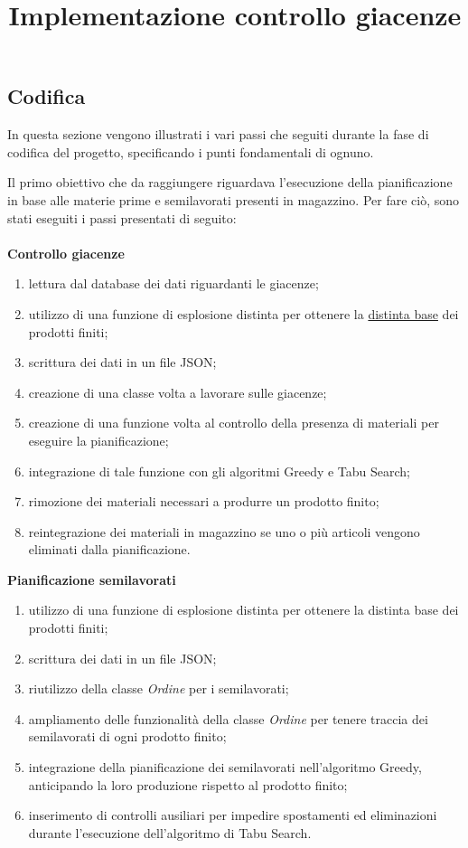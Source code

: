 \subsection{Codifica}

In questa sezione vengono illustrati i vari passi che seguiti durante la fase di codifica del progetto, specificando i punti fondamentali di ognuno.\\

\title{Implementazione controllo giacenze}

Il primo obiettivo che da raggiungere riguardava l'esecuzione della pianificazione in base alle materie prime e semilavorati presenti in magazzino.
Per fare ciò, sono stati eseguiti i passi presentati di seguito:\\ \\
\textbf{Controllo giacenze}
\begin{enumerate}
        \item lettura dal database dei dati riguardanti le giacenze;
        \item utilizzo di una funzione di esplosione distinta per ottenere la \hyperref[Distinta base]{distinta base\glo} dei prodotti finiti; 
        \item scrittura dei dati in un file JSON;
        \item creazione di una classe volta a lavorare sulle giacenze;
        \item creazione di una funzione volta al controllo della presenza di materiali per eseguire la pianificazione;
        \item integrazione di tale funzione con gli algoritmi Greedy e Tabu Search;
        \item rimozione dei materiali necessari a produrre un prodotto finito;
        \item reintegrazione dei materiali in magazzino se uno o più articoli vengono eliminati dalla pianificazione.\\
\end{enumerate}

\textbf{Pianificazione semilavorati} 
\begin{enumerate}
        \item utilizzo di una funzione di esplosione distinta per ottenere la distinta base dei prodotti finiti; 
        \item scrittura dei dati in un file JSON;
        \item riutilizzo della classe \textit{Ordine} per i semilavorati;
        \item ampliamento delle funzionalità della classe \textit{Ordine} per tenere traccia dei semilavorati di ogni prodotto finito;
        \item integrazione della pianificazione dei semilavorati nell'algoritmo Greedy, anticipando la loro produzione rispetto al prodotto finito;
        \item inserimento di controlli ausiliari per impedire spostamenti ed eliminazioni durante l'esecuzione dell'algoritmo di Tabu Search.\\
\end{enumerate}

